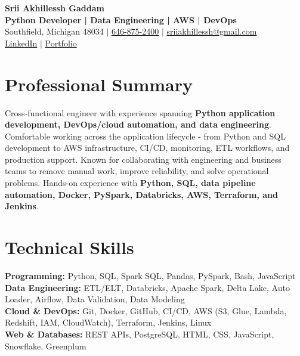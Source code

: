 \documentclass[letterpaper,10pt]{article}
\begin{document}
\fontsize{9.35pt}{10.45pt}\selectfont

\begin{center}
    {\LARGE \textbf{Srii Akhillessh Gaddam}} \\[-1pt]
    \textbf{Python Developer | Data Engineering | AWS | DevOps} \\[2pt]
    Southfield, Michigan 48034 $|$
    \href{tel:6468752400}{646-875-2400} $|$
    \href{mailto:sriiakhillessh@gmail.com}{sriiakhillessh@gmail.com} \\[1pt]
    \href{https://www.linkedin.com/in/srii-akhiilessh-gaddam-b48668191/}{LinkedIn} $|$
    \href{https://sriiakhillesshg.github.io/portfolio/}{Portfolio}
\end{center}
\vspace{-8pt}

\section{Professional Summary}
\small{Cross-functional engineer with experience spanning \textbf{Python application development, DevOps/cloud automation, and data engineering}. Comfortable working across the application lifecycle - from Python and SQL development to AWS infrastructure, CI/CD, monitoring, ETL workflows, and production support. Known for collaborating with engineering and business teams to remove manual work, improve reliability, and solve operational problems. Hands-on experience with \textbf{Python, SQL, data pipeline automation, Docker, PySpark, Databricks, AWS, Terraform, and Jenkins}.}

\section{Technical Skills}
\small{
\textbf{Programming:} Python, SQL, Spark SQL, Pandas, PySpark, Bash, JavaScript \\
\textbf{Data Engineering:} ETL/ELT, Databricks, Apache Spark, Delta Lake, Auto Loader, Airflow, Data Validation, Data Modeling \\
\textbf{Cloud \& DevOps:} Git, Docker, GitHub, CI/CD, AWS (S3, Glue, Lambda, Redshift, IAM, CloudWatch), Terraform, Jenkins, Linux \\
\textbf{Web \& Databases:} REST APIs, PostgreSQL, HTML, CSS, JavaScript, Snowflake, Greenplum
}
\end{document}
